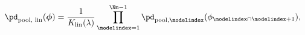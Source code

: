 \begin{equation}
  \pd_{\text{pool, lin}} (\boldsymbol{\phi}) =
  \frac{1}{K_{\text{lin}}(\lambda)}
  \prod_{\modelindex = 1}^{\Nm - 1}
  \pd_{\text{pool}, \modelindex}(\phi_{\modelindex \cap \modelindex + 1}),
  \label{eqn:silly-linear-overall}
\end{equation}